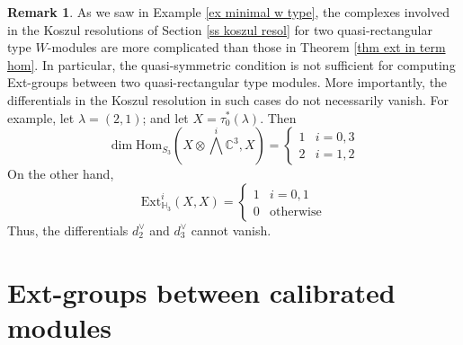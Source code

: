 \documentclass[11pt]{amsart}
\numberwithin{equation}{section}
\theoremstyle{definition}
\newtheorem{proposition}[thm]{Proposition}
\newtheorem{remark}[thm]{Remark}
\begin{document}
\begin{remark} \label{rm differentials non vanish ex}
As we saw in Example \ref{ex minimal w type}, the complexes involved in the Koszul resolutions of Section \ref{ss koszul resol} for two quasi-rectangular type $W$-modules are more complicated than those in Theorem \ref{thm ext in term hom}. In particular, the quasi-symmetric condition is not sufficient for computing Ext-groups between two quasi-rectangular type modules. More importantly, the differentials in the Koszul resolution in such cases do not necessarily vanish. For example, 
let $\lambda=(2,1)$; and let $X=\tau^*_0(\lambda)$. Then
\[  \dim\mathrm{Hom}_{S_3}(X\otimes \bigwedge^i \mathbb C^3, X)=\left\{ \begin{array}{cc} 1 & i =0, 3 \\  2 & i=1,2 \end{array} \right.
\]
On the other hand,
\[  \mathrm{Ext}^i_{\mathbb H_3}(X, X) = \left\{ \begin{array}{cc} 1 & i=0,1 \\ 0 & \mbox{otherwise} \end{array} \right. 
\]
Thus, the differentials $d_2^{\vee}$ and $d_3^{\vee}$ cannot vanish.
\end{remark}





\part{Ext-groups between calibrated modules}
\end{document}
